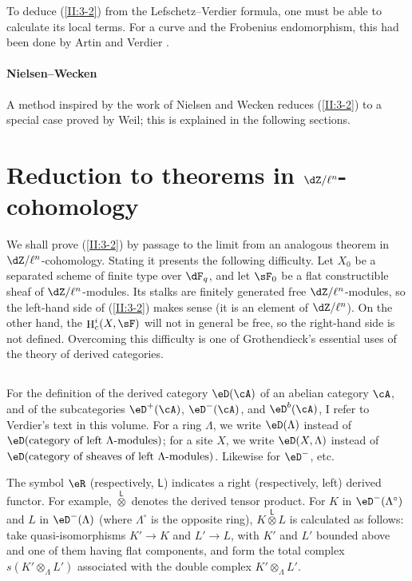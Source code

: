 \documentclass[12pt,oneside,english]{smfbook}
\DeclareMathOperator{\h}{H}
\newcommand{\lotimes}{{\overset{\mathsf{L}}{\otimes}}}
\begin{document}
To deduce (\ref{II:3-2}) from the Lefschetz--Verdier formula, one must be able to calculate its local terms. For a curve and the Frobenius endomorphism, this had been done by Artin and Verdier \cite{ve67}.

\paragraph{Nielsen--Wecken}
A method inspired by the work of Nielsen and Wecken reduces (\ref{II:3-2}) to a special case proved by Weil; this is explained in the following sections.

\section{Reduction to theorems in \texorpdfstring{$\dZ/\ell^n$}{Z/l n}-cohomology}\label{II:4}

We shall prove (\ref{II:3-2}) by passage to the limit from an analogous theorem in $\dZ/\ell^n$-cohomology. Stating it presents the following difficulty. Let $X_0$ be a separated scheme of finite type over $\dF_q$, and let $\sF_0$ be a flat constructible sheaf of $\dZ/\ell^n$-modules. Its stalks are finitely generated free $\dZ/\ell^n$-modules, so the left-hand side of (\ref{II:3-2}) makes sense (it is an element of $\dZ/\ell^n$). On the other hand, the $\h_c^i(X,\sF)$ will not in general be free, so the right-hand side is not defined. Overcoming this difficulty is one of Grothendieck's essential uses of the theory of derived categories.

\subsection{}\label{II:4-1}

For the definition of the derived category $\eD(\cA)$ of an abelian category $\cA$, and of the subcategories $\eD^+(\cA)$, $\eD^-(\cA)$, and $\eD^b(\cA)$, I refer to Verdier's text in this volume. For a ring $\Lambda$, we write $\eD(\Lambda)$ instead of $\eD(\text{category of left $\Lambda$-modules})$; for a site $X$, we write $\eD(X,\Lambda)$ instead of $\eD(\text{category of sheaves of left $\Lambda$-modules})$. Likewise for $\eD^-$, etc.

The symbol $\eR$ (respectively, $\mathsf{L}$) indicates a right (respectively, left) derived functor. For example, $\lotimes$ denotes the derived tensor product. For $K$ in $\eD^-(\Lambda^\circ)$ and $L$ in $\eD^-(\Lambda)$ (where $\Lambda^\circ$ is the opposite ring), $K\lotimes L$ is calculated as follows: take quasi-isomorphisms $K'\to K$ and $L'\to L$, with $K'$ and $L'$ bounded above and one of them having flat components, and form the total complex $s(K'\otimes_\Lambda L')$ associated with the double complex $K'\otimes_\Lambda L'$.
\end{document}
